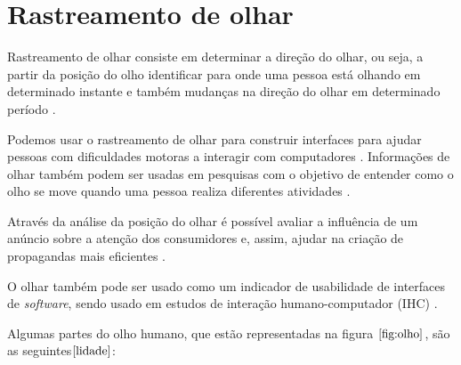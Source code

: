 \chapter{Rastreamento de olhar}


Rastreamento de olhar consiste em determinar a direção do olhar, ou seja, a partir da posição do olho identificar para onde uma pessoa está olhando em determinado instante e também mudanças na direção do olhar em determinado período \cite{lupung}.

Podemos usar o rastreamento de olhar para construir interfaces para ajudar pessoas com dificuldades motoras a interagir com computadores \cite{lidade}. Informações de olhar também podem ser usadas em pesquisas com o objetivo de entender como o olho se move quando uma pessoa realiza diferentes atividades \cite{lupung}.

Através da análise da posição do olhar é possível avaliar a influência de um anúncio sobre a atenção dos consumidores e, assim, ajudar na criação de propagandas mais eficientes \cite{duchowski2002breadth}.

O olhar também pode ser usado como um indicador de usabilidade de interfaces de \textit{software}, sendo usado em estudos de interação humano-computador (IHC) \cite{duchowski2002breadth}.

Algumas partes do olho humano, que estão representadas na figura $\ref{fig:olho}$,  são as seguintes$\cite{lidade}$:


